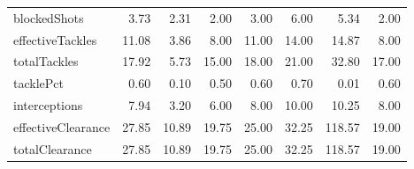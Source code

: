 \begin{table}[H]
\begin{tabular}{lrrrrrrr}
blockedShots & 3.73 & 2.31 & 2.00 & 3.00 & 6.00 & 5.34 & 2.00 \\
effectiveTackles & 11.08 & 3.86 & 8.00 & 11.00 & 14.00 & 14.87 & 8.00 \\
totalTackles & 17.92 & 5.73 & 15.00 & 18.00 & 21.00 & 32.80 & 17.00 \\
tacklePct & 0.60 & 0.10 & 0.50 & 0.60 & 0.70 & 0.01 & 0.60 \\
interceptions & 7.94 & 3.20 & 6.00 & 8.00 & 10.00 & 10.25 & 8.00 \\
effectiveClearance & 27.85 & 10.89 & 19.75 & 25.00 & 32.25 & 118.57 & 19.00 \\
totalClearance & 27.85 & 10.89 & 19.75 & 25.00 & 32.25 & 118.57 & 19.00 \\
\hline
\end{tabular}
\end{table}
